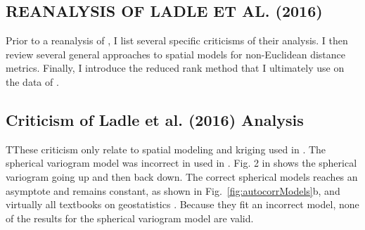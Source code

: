 \documentclass[11pt, titlepage]{article}\usepackage[]{graphicx}\usepackage[]{color}
\begin{document}
\begin{spacing}{1.9}
\begin{flushleft}







\section*{REANALYSIS OF LADLE ET AL. (2016)}

Prior to a reanalysis of \citet{Ladl:Avga:Whea:Boyc:pred:2016}, I list several specific criticisms of their analysis.  I then review several general approaches to spatial models for non-Euclidean distance metrics. Finally, I introduce the reduced rank method that I ultimately use on the data of \citet{Ladl:Avga:Whea:Boyc:pred:2016}.

\subsection*{Criticism of Ladle et al. (2016) Analysis}

TThese criticism only relate to spatial modeling and kriging used in \citet{Ladl:Avga:Whea:Boyc:pred:2016}. The spherical variogram model was incorrect in used in \citet{Ladl:Avga:Whea:Boyc:pred:2016}.  Fig. 2 in \citet{Ladl:Avga:Whea:Boyc:pred:2016} shows the spherical variogram going up and then back down.  The correct spherical models reaches an asymptote and remains constant, as shown in Fig.~\ref{fig:autocorrModels}b, and virtually all textbooks on geostatistics \citep{Jour:Huij:mini:1978,Isaa:Sriv:appl:1989,Cres:stat:1993,Goov:geos:1997,Chil:Delf:geos:1999,Fort:Dale:spat:2005,Webs:Oliv:geos:2007}. Because they fit an incorrect model, none of the results for the spherical variogram model are valid.
		

\end{flushleft}
\end{spacing}
\end{document}
